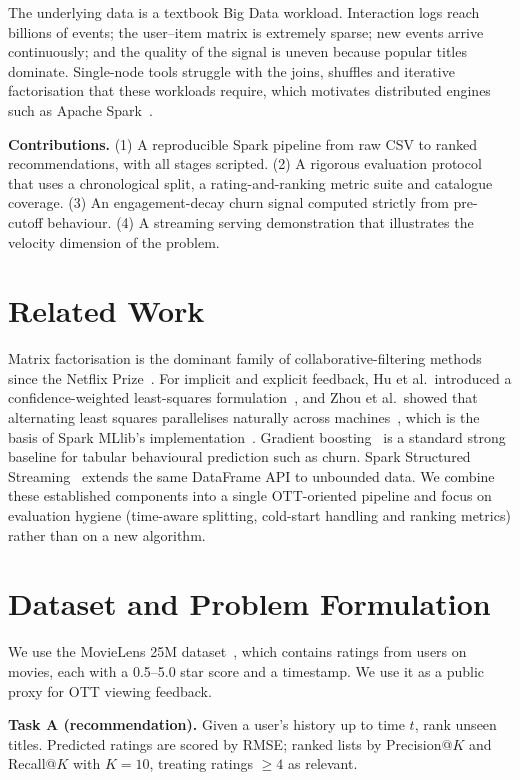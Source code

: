 \documentclass[conference]{IEEEtran}
\begin{document}
The underlying data is a textbook Big Data workload. Interaction logs reach billions of events; the user--item matrix is extremely sparse; new events arrive continuously; and the quality of the signal is uneven because popular titles dominate. Single-node tools struggle with the joins, shuffles and iterative factorisation that these workloads require, which motivates distributed engines such as Apache Spark~\cite{spark,mllib}.

\textbf{Contributions.} (1) A reproducible Spark pipeline from raw CSV to ranked recommendations, with all stages scripted. (2) A rigorous evaluation protocol that uses a chronological split, a rating-and-ranking metric suite and catalogue coverage. (3) An engagement-decay churn signal computed strictly from pre-cutoff behaviour. (4) A streaming serving demonstration that illustrates the velocity dimension of the problem.

\section{Related Work}
Matrix factorisation is the dominant family of collaborative-filtering methods since the Netflix Prize~\cite{koren}. For implicit and explicit feedback, Hu et al.\ introduced a confidence-weighted least-squares formulation~\cite{hu}, and Zhou et al.\ showed that alternating least squares parallelises naturally across machines~\cite{zhou}, which is the basis of Spark MLlib's implementation~\cite{mllib}. Gradient boosting~\cite{friedman} is a standard strong baseline for tabular behavioural prediction such as churn. Spark Structured Streaming~\cite{structured} extends the same DataFrame API to unbounded data. We combine these established components into a single OTT-oriented pipeline and focus on evaluation hygiene (time-aware splitting, cold-start handling and ranking metrics) rather than on a new algorithm.

\section{Dataset and Problem Formulation}
We use the MovieLens 25M dataset~\cite{movielens}, which contains \dsRatings{} ratings from \dsUsers{} users on \dsItems{} movies, each with a 0.5--5.0 star score and a timestamp. We use it as a public proxy for OTT viewing feedback.

\textbf{Task A (recommendation).} Given a user's history up to time $t$, rank unseen titles. Predicted ratings are scored by RMSE; ranked lists by Precision@$K$ and Recall@$K$ with $K{=}10$, treating ratings $\ge 4$ as relevant.
\end{document}
